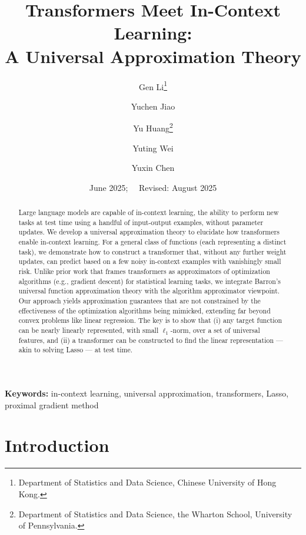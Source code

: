 \documentclass[english]{article}
\title{Transformers Meet In-Context Learning: \\ A Universal Approximation Theory\footnotetext{The first two authors contributed equally.}}
\author{%
Gen Li\thanks{Department of Statistics and Data Science, Chinese University of Hong Kong.}
\and
Yuchen Jiao\footnotemark[1] 
\and Yu Huang\thanks{Department of Statistics and Data Science, the Wharton School, University of Pennsylvania.} \and Yuting Wei\footnotemark[2]
 \and Yuxin Chen\footnotemark[2]
}
\date{June 2025;~~ Revised: August 2025}
\begin{document}
\theoremstyle{plain} \newtheorem{lemma}{\textbf{Lemma}}\newtheorem{proposition}{\textbf{Proposition}}\newtheorem{theorem}{\textbf{Theorem}}

\theoremstyle{assumption}\newtheorem{assumption}{\textbf{Assumption}}
\theoremstyle{remark}\newtheorem{remark}{\textbf{Remark}}


\maketitle 





\begin{abstract}


	Large language models are capable of in-context learning, the ability to perform new tasks at test time using a handful of input-output examples, without parameter updates. We develop a universal approximation theory to elucidate how transformers enable in-context learning. For a general class of functions (each representing a distinct task), we demonstrate how to construct a transformer that, without any further weight updates, can predict based on a few noisy in-context examples with vanishingly small risk. Unlike prior work that frames transformers as approximators of optimization algorithms (e.g., gradient descent) for statistical learning tasks, we integrate Barron's universal function approximation theory with the algorithm approximator viewpoint. Our approach yields approximation guarantees that are not constrained by the effectiveness of the optimization algorithms being mimicked, extending far beyond convex problems like linear regression. The key is to show that (i) any target function can be nearly linearly represented, with small $\ell_1$-norm, over a set of universal features, and (ii) a transformer can be constructed to find the linear representation --- akin to solving Lasso --- at test time. 


 

\end{abstract}


\noindent \textbf{Keywords:} in-context learning, universal approximation, transformers, Lasso, proximal gradient method


\setcounter{tocdepth}{2}
\tableofcontents


\section{Introduction}
\end{document}

